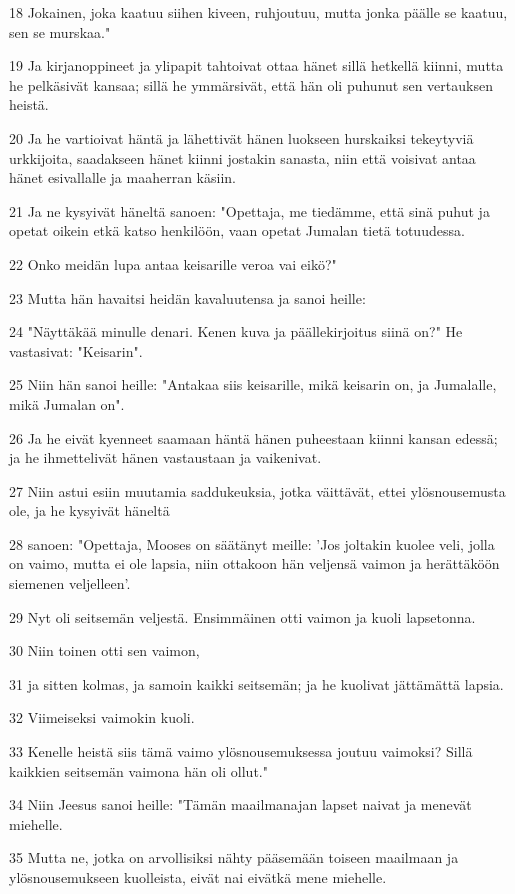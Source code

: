 \par 18 Jokainen, joka kaatuu siihen kiveen, ruhjoutuu, mutta jonka päälle se kaatuu, sen se murskaa."
\par 19 Ja kirjanoppineet ja ylipapit tahtoivat ottaa hänet sillä hetkellä kiinni, mutta he pelkäsivät kansaa; sillä he ymmärsivät, että hän oli puhunut sen vertauksen heistä.
\par 20 Ja he vartioivat häntä ja lähettivät hänen luokseen hurskaiksi tekeytyviä urkkijoita, saadakseen hänet kiinni jostakin sanasta, niin että voisivat antaa hänet esivallalle ja maaherran käsiin.
\par 21 Ja ne kysyivät häneltä sanoen: "Opettaja, me tiedämme, että sinä puhut ja opetat oikein etkä katso henkilöön, vaan opetat Jumalan tietä totuudessa.
\par 22 Onko meidän lupa antaa keisarille veroa vai eikö?"
\par 23 Mutta hän havaitsi heidän kavaluutensa ja sanoi heille:
\par 24 "Näyttäkää minulle denari. Kenen kuva ja päällekirjoitus siinä on?" He vastasivat: "Keisarin".
\par 25 Niin hän sanoi heille: "Antakaa siis keisarille, mikä keisarin on, ja Jumalalle, mikä Jumalan on".
\par 26 Ja he eivät kyenneet saamaan häntä hänen puheestaan kiinni kansan edessä; ja he ihmettelivät hänen vastaustaan ja vaikenivat.
\par 27 Niin astui esiin muutamia saddukeuksia, jotka väittävät, ettei ylösnousemusta ole, ja he kysyivät häneltä
\par 28 sanoen: "Opettaja, Mooses on säätänyt meille: 'Jos joltakin kuolee veli, jolla on vaimo, mutta ei ole lapsia, niin ottakoon hän veljensä vaimon ja herättäköön siemenen veljelleen'.
\par 29 Nyt oli seitsemän veljestä. Ensimmäinen otti vaimon ja kuoli lapsetonna.
\par 30 Niin toinen otti sen vaimon,
\par 31 ja sitten kolmas, ja samoin kaikki seitsemän; ja he kuolivat jättämättä lapsia.
\par 32 Viimeiseksi vaimokin kuoli.
\par 33 Kenelle heistä siis tämä vaimo ylösnousemuksessa joutuu vaimoksi? Sillä kaikkien seitsemän vaimona hän oli ollut."
\par 34 Niin Jeesus sanoi heille: "Tämän maailmanajan lapset naivat ja menevät miehelle.
\par 35 Mutta ne, jotka on arvollisiksi nähty pääsemään toiseen maailmaan ja ylösnousemukseen kuolleista, eivät nai eivätkä mene miehelle.
